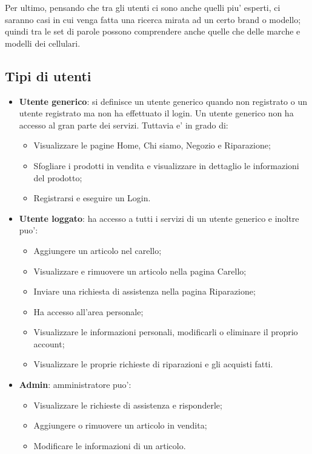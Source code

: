 Per ultimo, pensando che tra gli utenti ci sono anche quelli piu' esperti, ci saranno casi in cui
venga fatta una ricerca mirata ad un certo brand o modello; quindi tra le set di parole possono comprendere
anche quelle che delle marche e modelli dei cellulari.

\subsection{Tipi di utenti}
\begin{itemize}
	\item \textbf{Utente generico}: si definisce un utente generico quando non registrato o
	un utente registrato ma non ha effettuato il login. Un utente generico non ha accesso 
	al gran parte dei servizi. Tuttavia e' in grado di: 
	\begin{itemize}
	\item Visualizzare le pagine Home, Chi siamo, Negozio e Riparazione;
	\item Sfogliare i prodotti in vendita e visualizzare in dettaglio le informazioni del prodotto;
	\item Registrarsi e eseguire un Login.
	\end{itemize}

	\item \textbf{Utente loggato}: ha accesso a tutti i servizi di un utente generico e inoltre puo':
	\begin{itemize}
	\item Aggiungere un articolo nel carello;
	\item Visualizzare e rimuovere un articolo nella pagina Carello;
	\item Inviare una richiesta di assistenza nella pagina Riparazione;
	\item Ha accesso all'area personale;
	\item Visualizzare le informazioni personali, modificarli o eliminare il proprio account;
	\item Visualizzare le proprie richieste di riparazioni e gli acquisti fatti.
	\end{itemize}

	\item \textbf{Admin}: amministratore puo':
	\begin{itemize}
	\item Visualizzare le richieste di assistenza e risponderle;
	\item Aggiungere o rimuovere un articolo in vendita;
	\item Modificare le informazioni di un articolo.
	\end{itemize}
\end{itemize}



